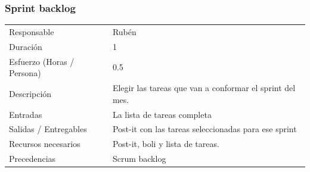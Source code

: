 \subsubsection{Sprint backlog}
\begin{table}[H]
    \begin{center}
        \begin{tabular}{l p{8cm}}
            Responsable                           & Rub\'{e}n \\
            Duraci\'{o}n                          & 1 \\ 
            Esfuerzo (Horas / Persona)            & 0.5 \\
            Descripci\'{o}n                       & Elegir las tareas que van a conformar el sprint del mes. \\
            Entradas                              & La lista de tareas completa\\
            Salidas / Entregables                 & Post-it con las tareas seleccionadas para ese sprint \\
            Recursos necesarios                   & Post-it, boli y lista de tareas. \\
            Precedencias                          & Scrum backlog \\
        \end{tabular}
    \end{center}
    
\end{table}

